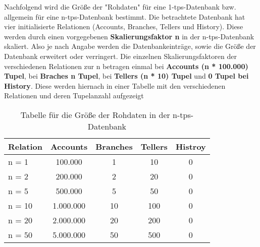 Nachfolgend wird die Größe der "Rohdaten" für eine 1-tps-Datenbank bzw. allgemein für eine n-tps-Datenbank bestimmt.
Die betrachtete Datenbank hat vier initialisierte Relationen (Accounts, Branches, Tellers und History).
Diese werden durch einen vorgegebenen \textbf{Skalierungsfaktor n} in der n-tps-Datenbank skaliert. Also je nach
Angabe werden die Datenbankeinträge, sowie die Größe der Datenbank erweitert oder verringert. Die einzelnen Skalierungsfaktoren
der verschiedenen Relationen zur n betragen einmal bei \textbf{Accounts (n * 100.000) Tupel}, bei \textbf{Braches n Tupel},
bei \textbf{Tellers (n * 10) Tupel} und \textbf{0 Tupel bei History}. Diese werden hiernach in einer Tabelle mit den
verschiedenen Relationen und deren Tupelanzahl aufgezeigt
\begin{table}[h!]
    \centering
    \begin{tabular}{|p{2.5cm}|c|c|c|c|}
        \hline
        Relation & Accounts & Branches & Tellers & Histroy \\  \hline
        n = 1 & 100.000 & 1 & 10 & 0 \\ \hline
        n = 2 & 200.000 & 2 & 20 & 0 \\ \hline
        n = 5 & 500.000 & 5 & 50 & 0 \\ \hline
        n = 10 & 1.000.000 & 10 & 100 & 0 \\ \hline
        n = 20 & 2.000.000& 20 & 200 & 0 \\ \hline
        n = 50 & 5.000.000& 50 & 500 & 0 \\ \hline
    \end{tabular}
    \caption{Tabelle für die Größe der Rohdaten in der n-tps-Datenbank}
    \label{tab:1}
\end{table}
